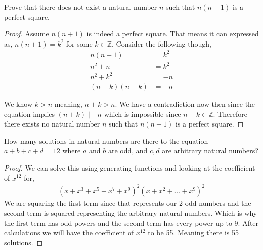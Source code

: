 \documentclass[11pt]{article}
\newenvironment{problem}[2][Problem\!]{\begin{trivlist}
\item[\hskip \labelsep {\bfseries #1}\hskip \labelsep {\bfseries #2}]}{\end{trivlist}}
\newcommand{\zz}{\mathbb Z}   %
\begin{document}
\begin{tcolorbox}
    \begin{problem} {OC | 11/10 | 88.}
        Prove that there does not exist a natural number $n$ such that $n(n+1)$ is a perfect square.
    \end{problem}
\end{tcolorbox}
\begin{proof}
    Assume $n(n+1)$ is indeed a perfect square. That means it can expressed as, $n(n+1)= k^{2}$ for some $k \in \zz$. Consider the following though,
    \begin{align*}
        n(n+1) &= k^{2} \\
        n^{2} + n &= k^{2} \\
        n^{2} + k^{2} &= -n \\
        (n+k)(n-k) &= -n
    \end{align*}

    We know $k > n$ meaning, $n +k  > n$. We have a contradiction now then since the equation implies $(n+k) \mid -n$ which is impossible since $n-k \in \zz$. Therefore there exists no natural number $n$ such that $n(n+1)$ is a perfect square. 
\end{proof}
\newpage
\begin{tcolorbox}
    \begin{problem} {IC | 11/01 | 109.}
        How many solutions in natural numbers are there to the equation $a + b + c + d = 12$ where $a$ and $b$ are odd, and $c,d$ are arbitrary natural numbers?
    \end{problem}
\end{tcolorbox}
\begin{proof}
    We can solve this using generating functions and looking at the coefficient of $x^{12}$ for,
    \begin{align*}
        (x + x^{3} + x^{5} + x^{7} + x^{9})^{2}(x + x^{2} + \dots + x^{9})^{2}
    \end{align*}
    We are squaring the first term since that represents our 2 odd numbers and the second term is squared representing the arbitrary natural numbers. Which is why the first term has odd powers and the second term has every power up to 9. After calculations we will have the coefficient of $x^{12}$ to be 55. Meaning there is 55 solutions.
    
\end{proof}
\end{document}
